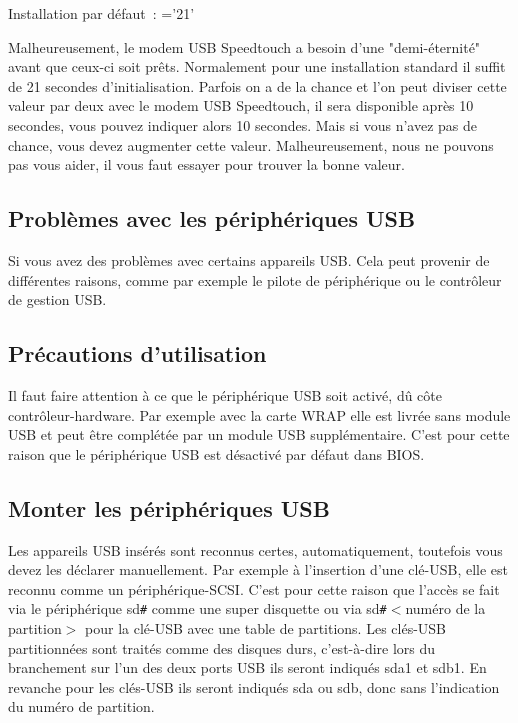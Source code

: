 \begin{description}
        Installation par défaut~: ='21'

        Malheureusement, le modem USB Speedtouch a besoin d'une
        "demi-éternité" avant que ceux-ci soit prêts. Normalement pour une
        installation standard il suffit de 21 secondes d'initialisation. Parfois
        on a de la chance et l'on peut diviser cette valeur par deux avec le
        modem USB Speedtouch, il sera disponible après 10 secondes,
        vous pouvez indiquer alors 10 secondes. Mais si vous n'avez pas de chance,
        vous devez augmenter cette valeur. Malheureusement, nous ne pouvons pas
        vous aider, il vous faut essayer pour trouver la bonne valeur.

\end{description}

\subsection{Problèmes avec les périphériques USB}

Si vous avez des problèmes avec certains appareils USB. Cela peut provenir de
différentes raisons, comme par exemple le pilote de périphérique ou le contrôleur
de gestion USB.

\subsection{Précautions d'utilisation}

Il faut faire attention à ce que le périphérique USB soit activé, dû côte
contrôleur-hardware. Par exemple avec la carte WRAP elle est livrée sans module
USB et peut être complétée par un module USB supplémentaire. C'est pour cette
raison que le périphérique USB est désactivé par défaut dans BIOS.

\subsection{Monter les périphériques USB}

Les appareils USB insérés sont reconnus certes, automatiquement, toutefois vous
devez les déclarer manuellement. Par exemple à l'insertion d'une clé-USB, elle
est reconnu comme un périphérique-SCSI. C'est pour cette raison que l'accès se
fait via le périphérique sd\verb=#= comme une super disquette ou via
sd\verb=#=$<$numéro de la partition$>$ pour la clé-USB avec une table de partitions.
Les clés-USB partitionnées sont traités comme des disques durs, c'est-à-dire
lors du branchement sur l'un des deux ports USB ils seront indiqués sda1 et sdb1.
En revanche pour les clés-USB ils seront indiqués sda ou sdb, donc sans
l'indication du numéro de partition.

